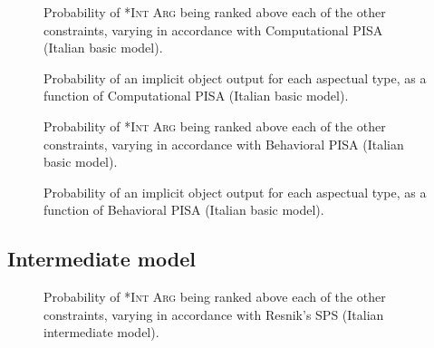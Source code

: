 \begin{figure}[H]
\caption{Probability of \textsc{*Int Arg} being ranked above each of the other constraints, varying in accordance with Computational PISA (Italian basic model).}
    
\end{figure}

\begin{figure}[H]
\caption{Probability of an implicit object output for each aspectual type, as a function of Computational PISA (Italian basic model).}
    
\end{figure}



\begin{figure}[H]
\caption{Probability of \textsc{*Int Arg} being ranked above each of the other constraints, varying in accordance with Behavioral PISA (Italian basic model).}
    
\end{figure}

\begin{figure}[H]
\caption{Probability of an implicit object output for each aspectual type, as a function of Behavioral PISA (Italian basic model).}
    
\end{figure}



\clearpage %

\subsection{Intermediate model} 


\begin{figure}[H]
\caption{Probability of \textsc{*Int Arg} being ranked above each of the other constraints, varying in accordance with Resnik's SPS (Italian intermediate model).}
    
\end{figure}

